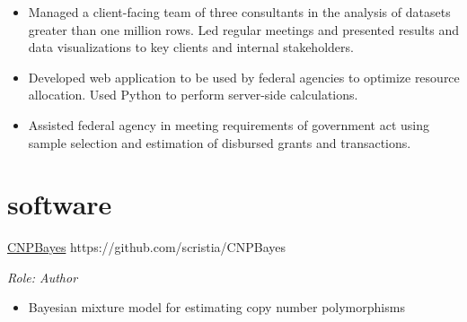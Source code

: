 \documentclass[]{friggeri-cv} %
\begin{document}
\begin{entrylist}
{\begin{itemize}
\renewcommand\labelitemi{--}
\item Managed a client-facing team of three consultants in the analysis of datasets greater than one million rows. 
Led regular meetings and presented results and data visualizations to key clients and internal stakeholders.
\item Developed web application to be used by federal agencies to optimize resource allocation. 
Used Python to perform server-side calculations.
\item Assisted federal agency in meeting requirements of government act using sample selection and estimation of disbursed grants and transactions.
\end{itemize}
}
\end{entrylist}


\section{software}
\begin{entrylist}
\entry
{}
{\href{https://github.com/scristia/CNPBayes}{CNPBayes}}
{https://github.com/scristia/CNPBayes}
{\emph{Role: Author}
\begin{itemize}
\renewcommand\labelitemi{--}
\item Bayesian mixture model for estimating copy number polymorphisms
\end{itemize}
}
\end{entrylist}
\end{document}
